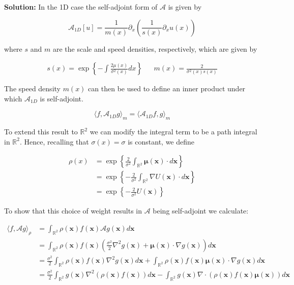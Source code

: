 \documentclass[12pt, a4paper]{article}
\begin{document}
\begin{enumerate}
\begin{enumerate}
        \textbf{Solution:} In the 1D case the self-adjoint form of $\mathcal A$ is given by 

        $$\mathcal A_{1D}[u]  = \frac{1}{m(x)}\partial_x \left( \frac{1}{s(x)} \partial_x u(x) \right)$$

        where $s$ and $m$ are the scale and speed densities, respectively, which are given by 

        \begin{align*}
            s(x) = \exp\left\{ - \int \frac{2 \mu(x)}{\sigma^2(x)}dx \right\} && m(x) = \frac{2}{\sigma^2(x)s(x)}
        \end{align*}

        The speed density $m(x)$ can then be used to define an inner product under which $\mathcal A_{1D}$ is self-adjoint. 

        $$\langle f, \mathcal A_{1D} g\rangle_m = \langle \mathcal A_{1D}f,  g\rangle_m$$

        To extend this result to $\mathbb R^2$ we can modify the integral term to be a path integral in $\mathbb R^2$. Hence, recalling that $\sigma(x)=\sigma$ is constant, we define 

        \begin{align*}
            \rho(x) &= \exp \left\{ \frac{2}{\sigma^2} \int_{\mathbb R^2} \boldsymbol \mu(\mathbf x) \cdot d \mathbf x \right\} \\
            &= \exp \left\{ -\frac{2}{\sigma^2} \int_{\mathbb R^2} \nabla U(\mathbf x)  \cdot d \mathbf x \right\} \\
            &= \exp \left\{ -\frac{2}{\sigma^2} U(\mathbf x)  \right\}
        \end{align*}
        
        To show that this choice of weight results in $\mathcal A$ being self-adjoint we calculate:

        \begin{align*}
            \langle f, \mathcal A g \rangle_\rho &= \int_{\mathbb R^2} \rho(\mathbf x) f(\mathbf x) \mathcal A g(\mathbf x) d\mathbf x \\
            &=\int_{\mathbb R^2} \rho(\mathbf x) f(\mathbf x) \left( \frac{\sigma^2}{2} \nabla^2 g(\mathbf x) + \boldsymbol \mu(\mathbf x) \cdot \nabla g(\mathbf x) \right) d\mathbf x \\
            &= \frac{\sigma^2}{2} \int_{\mathbb R^2} \rho(\mathbf x) f(\mathbf x) \nabla^2 g(\mathbf x) d\mathbf x + \int_{\mathbb R^2} \rho(\mathbf x) f(\mathbf x) \boldsymbol \mu(\mathbf x) \cdot \nabla g(\mathbf x) d\mathbf x \\
            &= \frac{\sigma^2}{2} \int_{\mathbb R^2}g(\mathbf x) \nabla^2 \left( \rho(\mathbf x) f(\mathbf x) \right) d\mathbf x - \int_{\mathbb R^2} g(\mathbf x) \nabla \cdot \left( \rho(\mathbf x) f(\mathbf x) \boldsymbol \mu (\mathbf x) \right) d\mathbf x 
        \end{align*}


\end{enumerate}
\end{enumerate}
\end{document}
